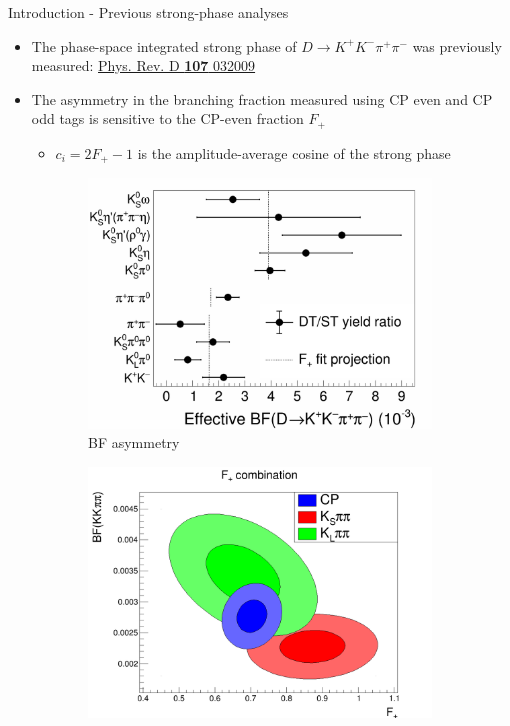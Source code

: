 \documentclass{beamer}
\begin{document}
\begin{frame}{Introduction - Previous strong-phase analyses}
  \begin{itemize}
    \setlength\itemsep{1.0em}
    \item{The phase-space integrated strong phase of $D\to K^+K^-\pi^+\pi^-$ was previously measured: \href{https://journals.aps.org/prd/abstract/10.1103/PhysRevD.107.032009}{Phys. Rev. D \textbf{107} 032009}}
    \item{The asymmetry in the branching fraction measured using CP even and CP odd tags is sensitive to the CP-even fraction $F_+$}
    \begin{itemize}
      \item{$c_i = 2F_+ - 1$ is the amplitude-average cosine of the strong phase}
    \end{itemize}
  \end{itemize}
  \begin{figure}
    \centering
    \begin{subfigure}{0.50\textwidth}
      \centering
      \includegraphics[width=1.0\textwidth]{Plots/CPeven_fraction_combination_CPtags.png}
      \caption{BF asymmetry}
    \end{subfigure}%
    \begin{subfigure}{0.50\textwidth}
      \centering
      \includegraphics[width=1.0\textwidth,trim={0 0 0 3.0cm},clip=true]{Plots/FPlus_contours.png}

\end{subfigure}
\end{figure}
\end{frame}
\end{document}
